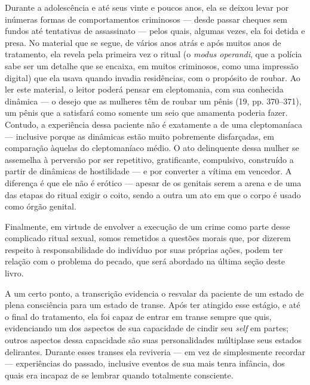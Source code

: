 Durante a adolescência e até seus vinte e poucos anos, ela se deixou
levar por inúmeras formas de comportamentos criminosos --- desde
passar cheques sem fundos até tentativas de assassinato --- pelos
quais, algumas vezes, ela foi detida e presa. No material que se segue,
de vários anos atrás e após muitos anos de tratamento, ela revela pela
primeira vez o ritual (o \textit{modus operandi}, que a
polícia sabe ser um detalhe que se encaixa, em muitos criminosos, como
uma impressão digital) que ela usava quando invadia residências, com o
propósito de roubar. Ao ler este material, o leitor poderá pensar em
cleptomania,\idxclept{} com sua conhecida dinâmica --- o desejo que as
mulheres têm de roubar um pênis\idxpenisclep{} (19, pp. 370--371), um pênis que a
satisfará como somente um seio que amamenta poderia fazer. Contudo, a
experiência dessa paciente não é exatamente a de uma cleptomaníaca ---
inclusive porque as dinâmicas estão muito pobremente disfarçadas, em
comparação àquelas do cleptomaníaco médio. O ato delinquente dessa
mulher se assemelha à perversão por ser repetitivo,\idxpervrepet{} gratificante,
compulsivo, construído a partir de dinâmicas de hostilidade --- e por
converter a vítima em vencedor. A diferença é que ele não é erótico
 --- apesar de os genitais serem a arena e de uma das etapas do ritual
exigir o coito, sendo a outra um ato em que o corpo é usado como órgão
genital.

Finalmente, em virtude de envolver a execução de um crime como parte
desse complicado ritual sexual, somos remetidos a questões\idxpervrespo{} morais\idxrespo{} que,
por dizerem respeito à responsabilidade do indivíduo por suas próprias
ações, podem ter relação com o problema do pecado,\idxpecad{} que será abordado na
última seção deste livro.

A um certo ponto, a transcrição evidencia o resvalar da paciente de
um estado de plena consciência para um estado de transe. Após ter
atingido esse estágio, e até o final do tratamento, ela foi capaz de
entrar em transe sempre que quis, evidenciando um dos aspectos de sua
capacidade de cindir seu \textit{self} em partes; outros aspectos dessa
capacidade são suas personalidades múltiplas\idxmultp[|)] e seus estados delirantes.\idxaluci{}
Durante esses transes ela reviveria --- em vez de simplesmente
recordar --- experiências do passado, inclusive eventos de sua mais
tenra infância, dos quais era incapaz de se lembrar quando totalmente
consciente.

